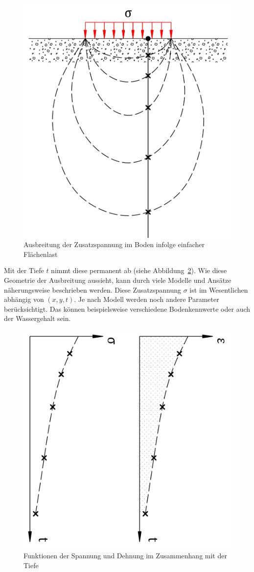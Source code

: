 \begin{figure}
	\centering
	\includegraphics[width=0.4\linewidth,keepaspectratio]{papers/spannung/Grafiken/Bild4.png}
	\caption{Ausbreitung der Zusatzspannung im Boden infolge einfacher Flächenlast}
	\label{fig:Bild4}
\end{figure}

Mit der Tiefe $t$ nimmt diese permanent ab (siehe Abbildung~\ref{fig:Bild5}).
Wie diese Geometrie der Ausbreitung aussieht, kann durch viele Modelle und Ansätze näherungsweise beschrieben werden.
Diese Zusatzspannung $\sigma$ ist im Wesentlichen abhängig von $(x,y,t)$.
Je nach Modell werden noch andere Parameter berücksichtigt.
Das können beispielsweise verschiedene Bodenkennwerte oder auch der Wassergehalt sein.

\begin{figure}
	\centering
	\includegraphics[width=0.35\linewidth,keepaspectratio]{papers/spannung/Grafiken/Bild5.png}
	\caption{Funktionen der Spannung und Dehnung im Zusammenhang mit der Tiefe}
	\label{fig:Bild5}
\end{figure}

